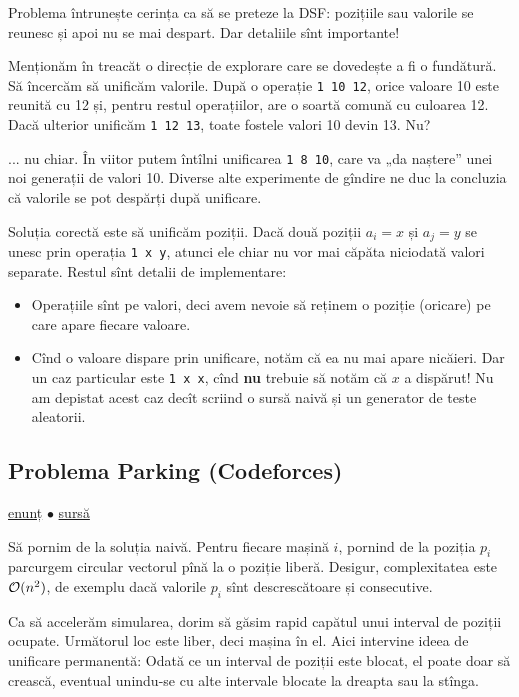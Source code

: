 \documentclass[../main.tex]{subfiles}
\begin{document}
Problema întrunește cerința ca să se preteze la DSF: pozițiile sau valorile se reunesc și apoi nu se mai despart. Dar detaliile sînt importante!

Menționăm în treacăt o direcție de explorare care se dovedește a fi o fundătură. Să încercăm să unificăm valorile. După o operație \texttt{1 10 12}, orice valoare 10 este reunită cu 12 și, pentru restul operațiilor, are o soartă comună cu culoarea 12. Dacă ulterior unificăm \texttt{1 12 13}, toate fostele valori 10 devin 13. Nu?

... nu chiar. În viitor putem întîlni unificarea \texttt{1 8 10}, care va „da naștere” unei noi generații de valori 10. Diverse alte experimente de gîndire ne duc la concluzia că valorile se pot despărți după unificare.

Soluția corectă este să unificăm poziții. Dacă două poziții $a_i = x$ și $a_j = y$ se unesc prin operația \texttt{1 x y}, atunci ele chiar nu vor mai căpăta niciodată valori separate. Restul sînt detalii de implementare:

\begin{itemize}
  \item Operațiile sînt pe valori, deci avem nevoie să reținem o poziție (oricare) pe care apare fiecare valoare.
  \item Cînd o valoare dispare prin unificare, notăm că ea nu mai apare nicăieri. Dar un caz particular este \texttt{1 x x}, cînd \textbf{nu} trebuie să notăm că $x$ a dispărut! Nu am depistat acest caz decît scriind o sursă naivă și un generator de teste aleatorii.
\end{itemize}


\subsection{Problema Parking (Codeforces)}
\label{problem:parking}

\href{https://codeforces.com/edu/course/2/lesson/7/2/practice/contest/289391/problem/B}{enunț}
$\bullet$
\hyperref[code:parking]{sursă}

Să pornim de la soluția naivă. Pentru fiecare mașină $i$, pornind de la poziția $p_i$ parcurgem circular vectorul pînă la o poziție liberă. Desigur, complexitatea este $\mathcal{O}(n^2)$, de exemplu dacă valorile $p_i$ sînt descrescătoare și consecutive.

Ca să accelerăm simularea, dorim să găsim rapid capătul unui interval de poziții ocupate. Următorul loc este liber, deci mașina în el. Aici intervine ideea de unificare permanentă: Odată ce un interval de poziții este blocat, el poate doar să crească, eventual unindu-se cu alte intervale blocate la dreapta sau la stînga.
\end{document}
